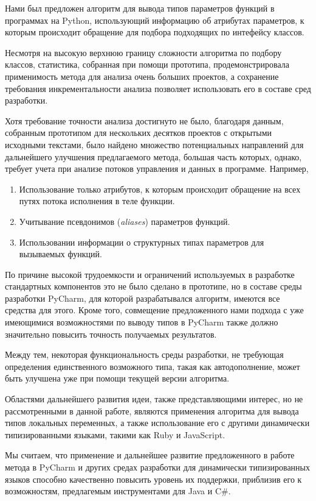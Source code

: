 \conclusion

Нами был предложен алгоритм для вывода типов параметров функций в программах на
Python, использующий информацию об атрибутах параметров, к которым происходит
обращение для подбора подходящих по интефейсу классов. 

Несмотря на высокую верхнюю границу сложности алгоритма по подбору классов,
статистика, собранная при помощи прототипа, продемонстрировала применимость
метода для анализа очень больших проектов, а сохранение требования
инкрементальности анализа позволяет использовать его в составе сред разработки. 

Хотя требование точности анализа достигнуто не было, благодаря
данным, собранным прототипом для нескольких десятков проектов с открытыми
исходными текстами, было найдено множество потенциальных направлений для
дальнейшего улучшения предлагаемого метода, большая часть которых, однако,
требует учета при анализе потоков управления и данных в программе. Например, 

\begin{enumerate}
    \item Использование только атрибутов, к которым происходит обращение на всех
      путях потока исполнения в теле функции.
    \item Учитывание псевдонимов (\emph{aliases}) параметров функций.
    \item Использовании информации о структурных типах параметров для вызываемых
      функций.
\end{enumerate}

По причине высокой трудоемкости и ограничений используемых в разработке
стандартных компонентов это не было сделано в прототипе, но в составе среды
разработки PyCharm, для которой разрабатывался алгоритм, имеются все средства
для этого. Кроме того, совмещение предложенного нами подхода с уже имеющимися
возможностями по выводу типов в PyCharm также должно значительно повысить
точность получаемых результатов.

Между тем, некоторая функциональность среды разработки, не требующая определения
единственного возможного типа, такая как автодополнение, может быть улучшена уже
при помощи текущей версии алгоритма.

Областями дальнейшего развития идеи, также представляющими интерес, но не
рассмотренными в данной работе, являются применения алгоритма для вывода типов
локальных переменных, а также использование его с другими динамически
типизированными языками, такими как Ruby и JavaScript.

Мы считаем, что применение и дальнейшее развитие предложенного в работе метода
в PyCharm и других средах разработки для динамически типизированных языков
способно качественно повысить уровень их поддержки, приблизив его к
возможностям, предлагемым инструментами для Java и C\#.





